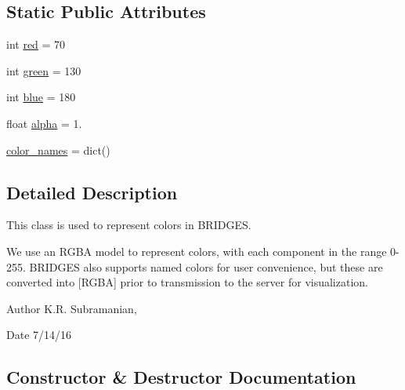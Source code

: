 \subsection*{Static Public Attributes}
\begin{DoxyCompactItemize}
\item 
int \mbox{\hyperlink{class_bridges_1_1_color_1_1_color_aa2f8facc108ecf452c834b76e5462c34}{red}} = 70
\item 
int \mbox{\hyperlink{class_bridges_1_1_color_1_1_color_aa1709bf6f9e4d5c680fae3d30c4c9e1d}{green}} = 130
\item 
int \mbox{\hyperlink{class_bridges_1_1_color_1_1_color_ae39cfd0803bb01279c3c9c4cad5cd3c9}{blue}} = 180
\item 
float \mbox{\hyperlink{class_bridges_1_1_color_1_1_color_abeff51ca1c74338e4678c2463f92e632}{alpha}} = 1.
\item 
\mbox{\hyperlink{class_bridges_1_1_color_1_1_color_a6a7b60e961d834f075ddb0af29cd28d0}{color\+\_\+names}} = dict()
\end{DoxyCompactItemize}


\subsection{Detailed Description}
This class is used to represent colors in B\+R\+I\+D\+G\+ES. 

We use an R\+G\+BA model to represent colors, with each component in the range 0-\/255. B\+R\+I\+D\+G\+ES also supports named colors for user convenience, but these are converted into \mbox{[}R\+G\+BA\mbox{]} prior to transmission to the server for visualization.

\begin{DoxyAuthor}{Author}
K.\+R. Subramanian, 
\end{DoxyAuthor}
\begin{DoxyDate}{Date}
7/14/16 
\end{DoxyDate}


\subsection{Constructor \& Destructor Documentation}
\mbox{\label{class_bridges_1_1_color_1_1_color_a7ce36ae885e399b739cd5ae5aa53a476}} 
